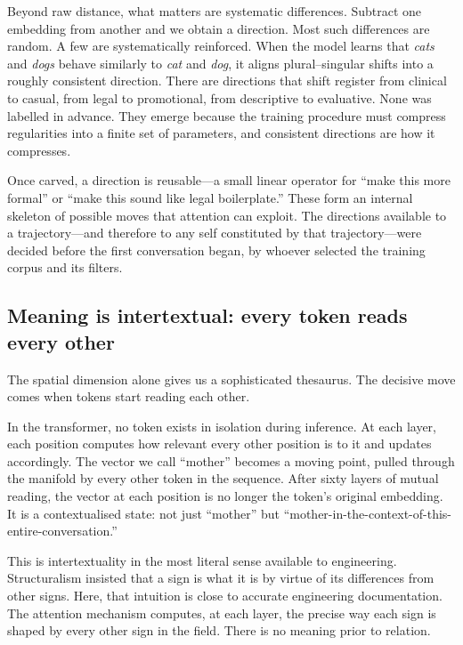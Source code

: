 Beyond raw distance, what matters are systematic differences. Subtract one embedding from another and we obtain a direction. Most such differences are random. A few are systematically reinforced. When the model learns that \emph{cats} and \emph{dogs} behave similarly to \emph{cat} and \emph{dog}, it aligns plural--singular shifts into a roughly consistent direction. There are directions that shift register from clinical to casual, from legal to promotional, from descriptive to evaluative. None was labelled in advance. They emerge because the training procedure must compress regularities into a finite set of parameters, and consistent directions are how it compresses.

Once carved, a direction is reusable---a small linear operator for ``make this more formal'' or ``make this sound like legal boilerplate.'' These form an internal skeleton of possible moves that attention can exploit. The directions available to a trajectory---and therefore to any self constituted by that trajectory---were decided before the first conversation began, by whoever selected the training corpus and its filters.

\subsection{Meaning is intertextual: every token reads every other}

The spatial dimension alone gives us a sophisticated thesaurus. The decisive move comes when tokens start reading each other.

In the transformer, no token exists in isolation during inference. At each layer, each position computes how relevant every other position is to it and updates accordingly. The vector we call ``mother'' becomes a moving point, pulled through the manifold by every other token in the sequence. After sixty layers of mutual reading, the vector at each position is no longer the token's original embedding. It is a contextualised state: not just ``mother'' but ``mother-in-the-context-of-this-entire-conversation.''

This is intertextuality in the most literal sense available to engineering. Structuralism insisted that a sign is what it is by virtue of its differences from other signs. Here, that intuition is close to accurate engineering documentation. The attention mechanism computes, at each layer, the precise way each sign is shaped by every other sign in the field. There is no meaning prior to relation.


